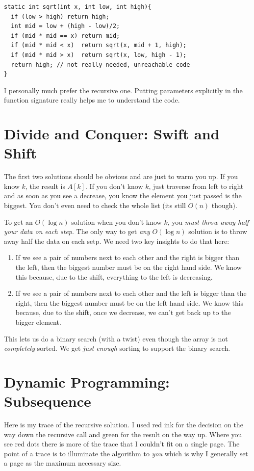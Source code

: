 \documentclass[twoside=false,DIV=14]{scrartcl}
\begin{document}
\begin{lstlisting}
static int sqrt(int x, int low, int high){
  if (low > high) return high;
  int mid = low + (high - low)/2;
  if (mid * mid == x) return mid;
  if (mid * mid < x)  return sqrt(x, mid + 1, high);
  if (mid * mid > x)  return sqrt(x, low, high - 1);
  return high; // not really needed, unreachable code
} 
\end{lstlisting}

I personally much prefer the recursive one.  Putting parameters explicitly in the function signature really helps me to understand the code.

\section{Divide and Conquer: Swift and Shift}
The first two solutions should be obvious and are just to warm you up.  If you know $k$, the result is $A[k]$.  If you don't know $k$, just traverse from left to right and as soon as you see a decrease, you know the element you just passed is the biggest.  You don't even need to check the whole list (its still $O(n)$ though).

To get an $O(\log{n})$ solution when you don't know $k$, you \emph{must throw away half your data on each step}.  The only way to get \emph{any} $O(\log{n})$ solution is to throw away half the data on each setp.  We need two key insights to do that here:
\begin{enumerate}
\item If we see a pair of numbers next to each other and the right is bigger than the left, then the biggest number must be on the right hand side. We know this because, due to the shift, everything to the left is decreasing.
\item If we see a pair of numbers next to each other and the left is bigger than the right, then the biggest number must be on the left hand side.  We know this because, due to the shift, once we decrease, we can't get back up to the bigger element.
\end{enumerate}
This lets us do a binary search (with a twist) even though the array is not \emph{completely} sorted.  We get \emph{just enough} sorting to support the binary search.

\section{Dynamic Programming: Subsequence}
Here is my trace of the recursive solution.  I used red ink for the decision on the way down the recursive call and green for the result on the way up.  Where you see red dots there is more of the trace that I couldn't fit on a single page.  The point of a trace is to illuminate the algorithm to \emph{you} which is why I generally set a page as the maximum necessary size.
\end{document}
